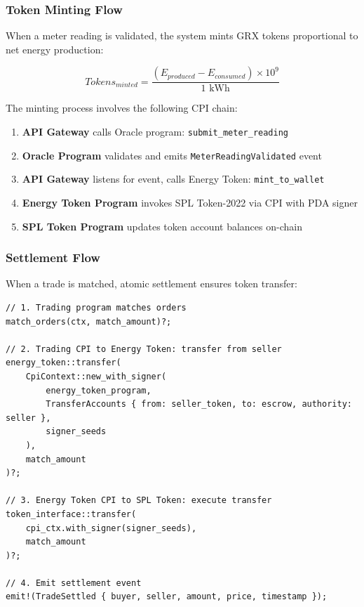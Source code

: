 \documentclass[conference]{IEEEtran}
\begin{document}
\subsubsection{Token Minting Flow}

When a meter reading is validated, the system mints GRX tokens proportional to net energy production:

\begin{equation}
Tokens_{minted} = \frac{(E_{produced} - E_{consumed}) \times 10^9}{1 \text{ kWh}}
\label{eq:minting}
\end{equation}

The minting process involves the following CPI chain:

\begin{enumerate}
    \item \textbf{API Gateway} calls Oracle program: \texttt{submit\_meter\_reading}
    \item \textbf{Oracle Program} validates and emits \texttt{MeterReadingValidated} event
    \item \textbf{API Gateway} listens for event, calls Energy Token: \texttt{mint\_to\_wallet}
    \item \textbf{Energy Token Program} invokes SPL Token-2022 via CPI with PDA signer
    \item \textbf{SPL Token Program} updates token account balances on-chain
\end{enumerate}

\subsubsection{Settlement Flow}

When a trade is matched, atomic settlement ensures token transfer:

\begin{lstlisting}[caption={Settlement CPI Flow}]
// 1. Trading program matches orders
match_orders(ctx, match_amount)?;

// 2. Trading CPI to Energy Token: transfer from seller
energy_token::transfer(
    CpiContext::new_with_signer(
        energy_token_program,
        TransferAccounts { from: seller_token, to: escrow, authority: seller },
        signer_seeds
    ),
    match_amount
)?;

// 3. Energy Token CPI to SPL Token: execute transfer
token_interface::transfer(
    cpi_ctx.with_signer(signer_seeds),
    match_amount
)?;

// 4. Emit settlement event
emit!(TradeSettled { buyer, seller, amount, price, timestamp });
\end{lstlisting}
\end{document}
